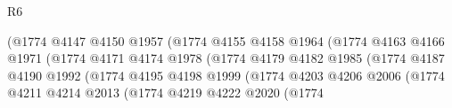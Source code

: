 \begin{lexlean}{R6}
\begin{coremodule}
                                                (@1774
                                                  @4147
                                                  @4150
                                                  @1957
                                                  (@1774
                                                    @4155
                                                    @4158
                                                    @1964
                                                    (@1774
                                                      @4163
                                                      @4166
                                                      @1971
                                                      (@1774
                                                        @4171
                                                        @4174
                                                        @1978
                                                        (@1774
                                                          @4179
                                                          @4182
                                                          @1985
                                                          (@1774
                                                            @4187
                                                            @4190
                                                            @1992
                                                            (@1774
                                                              @4195
                                                              @4198
                                                              @1999
                                                              (@1774
                                                                @4203
                                                                @4206
                                                                @2006
                                                                (@1774
                                                                  @4211
                                                                  @4214
                                                                  @2013
                                                                  (@1774
                                                                    @4219
                                                                    @4222
                                                                    @2020
                                                                    (@1774

\end{coremodule}
\end{lexlean}
